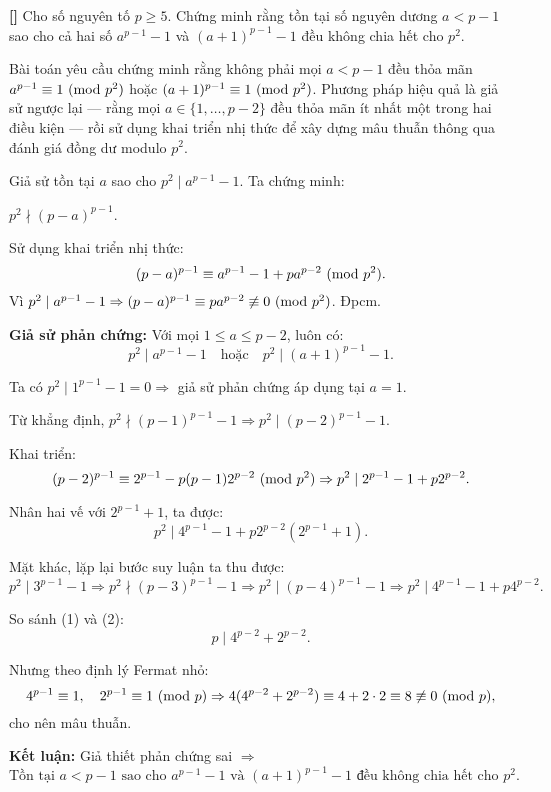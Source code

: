\documentclass[../05-modular-arithmetic-a.tex]{subfiles}
\begin{document}
\begin{example*}\label{example:RUS-2015-D7-P5}\textbf{[]}
	Cho số nguyên tố \( p \ge 5 \). Chứng minh rằng tồn tại số nguyên dương \( a < p - 1 \) sao cho cả hai số \( a^{p-1} - 1 \) và \( (a+1)^{p-1} - 1 \) đều không chia hết cho \( p^2 \).
\end{example*}

\begin{story*}
    Bài toán yêu cầu chứng minh rằng không phải mọi \( a < p - 1 \) đều thỏa mãn \( a^{p-1} \equiv 1 \ (\mathrm{mod}\ p^2) \) hoặc \( (a+1)^{p-1} \equiv 1 \ (\mathrm{mod}\ p^2) \).  
    Phương pháp hiệu quả là giả sử ngược lại — rằng mọi \( a \in \{1, \dots, p - 2\} \) đều thỏa mãn ít nhất một trong hai điều kiện — rồi sử dụng khai triển nhị thức để xây dựng mâu thuẫn thông qua đánh giá đồng dư modulo \( p^2 \).
\end{story*}

\bigbreak

\begin{soln}\footnotemark
	Giả sử tồn tại \( a \) sao cho \( p^2 \mid a^{p-1} - 1 \). Ta chứng minh:

	\begin{claim*}
		\( p^2 \nmid (p - a)^{p-1} \).
	\end{claim*}
	\begin{subproof}
		Sử dụng khai triển nhị thức:
		\[
			(p - a)^{p-1} \equiv a^{p-1} - 1 + pa^{p-2} \ (\mathrm{mod}\ p^2).
		\]
		Vì \( p^2 \mid a^{p-1} - 1 \Rightarrow (p - a)^{p-1} \equiv pa^{p-2} \not\equiv 0 \ (\mathrm{mod}\ p^2) \). Đpcm.
	\end{subproof}

	\textbf{Giả sử phản chứng:} Với mọi \( 1 \le a \le p - 2 \), luôn có:
	\[
		p^2 \mid a^{p-1} - 1 \quad \text{hoặc} \quad p^2 \mid (a+1)^{p-1} - 1.
	\]

	Ta có \( p^2 \mid 1^{p-1} - 1 = 0 \Rightarrow \) giả sử phản chứng áp dụng tại \( a = 1 \).

	Từ khẳng định, \( p^2 \nmid (p-1)^{p-1} - 1 \Rightarrow p^2 \mid (p - 2)^{p-1} - 1 \).

	Khai triển:
	\[
		(p - 2)^{p-1} \equiv 2^{p-1} - p(p-1)2^{p-2} \ (\mathrm{mod}\ p^2)
	\Rightarrow p^2 \mid 2^{p-1} - 1 + p2^{p-2}.
	\]

	Nhân hai vế với \( 2^{p-1} + 1 \), ta được:
	\[
		p^2 \mid 4^{p-1} - 1 + p2^{p-2}(2^{p-1} + 1). \tag{1}
	\]

	Mặt khác, lặp lại bước suy luận ta thu được:
	\[
		p^2 \mid 3^{p-1} - 1 \Rightarrow p^2 \nmid (p - 3)^{p-1} - 1 \Rightarrow p^2 \mid (p - 4)^{p-1} - 1
	\Rightarrow p^2 \mid 4^{p-1} - 1 + p4^{p-2}. \tag{2}
	\]

	So sánh (1) và (2):
	\[
		p \mid 4^{p-2} + 2^{p-2}.
	\]

	Nhưng theo định lý Fermat nhỏ:
	\[
		4^{p-1} \equiv 1,\quad 2^{p-1} \equiv 1 \ (\mathrm{mod}\ p)
	\Rightarrow 4(4^{p-2} + 2^{p-2}) \equiv 4 + 2 \cdot 2 \equiv 8 \not\equiv 0 \ (\mathrm{mod}\ p),
	\]
	cho nên mâu thuẫn.

	\textbf{Kết luận:} Giả thiết phản chứng sai \( \Rightarrow \)
	\[
		\boxed{\text{Tồn tại } a < p - 1 \text{ sao cho } a^{p-1} - 1 \text{ và } (a+1)^{p-1} - 1 \text{ đều không chia hết cho } p^2.}
	\]
\end{soln}

\end{document}
